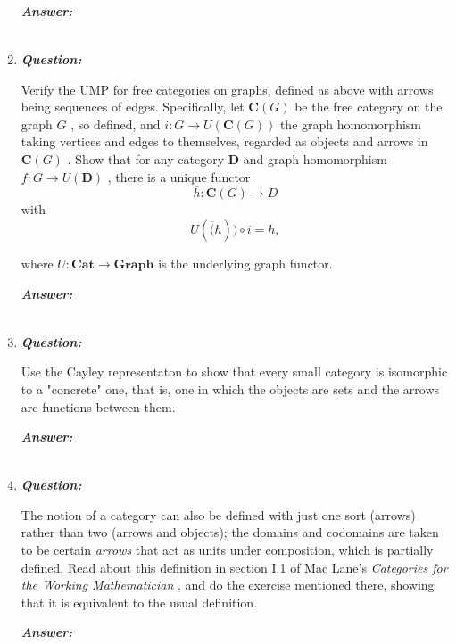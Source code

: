 \documentclass{article}
\begin{document}
\begin{enumerate}
	      \textbf{\textit{Answer:}}

	      \begin{align*}
	      \end{align*}



	\item
	      \textbf{\textit{Question:}}

	      Verify the UMP for free categories on graphs, defined as above with arrows being sequences of edges. Specifically, let $ \textbf{C} (G) $ be the free category on the graph $ G $ , so defined, and $ i : G \rightarrow U(\textbf{C}(G) ) $ the graph homomorphism taking vertices and edges to themselves, regarded as objects and arrows in $ \textbf{C} (G) $ . Show that for any category \textbf{D} and graph homomorphism $ f : G \rightarrow U(\textbf{D} ) $ , there is a unique functor
	      \[
		      \overline{h} : \textbf{C}(G) \rightarrow D
	      \]
	      with
	      \[ U(\overline(h)) \circ i = h ,\]

	      where $ U : \textbf{Cat} \rightarrow \textbf{Graph}  $ is the underlying graph functor.


	      \textbf{\textit{Answer:}}

	      \begin{align*}
	      \end{align*}



	\item
	      \textbf{\textit{Question:}}

	      Use the Cayley representaton to show that every small category is isomorphic to a "concrete" one, that is, one in which the objects are sets and the arrows are functions between them.

	      \textbf{\textit{Answer:}}

	      \begin{align*}
	      \end{align*}



	\item
	      \textbf{\textit{Question:}}

	      The notion of a category can also be defined with just one sort (arrows) rather than two (arrows and objects); the domains and codomains are taken to be certain \textit{arrows} that act as units under composition, which is partially defined. Read about this definition in section I.1 of Mac Lane's \textit{Categories for the Working Mathematician} , and do the exercise mentioned there, showing that it is equivalent to the usual definition.

	      \textbf{\textit{Answer:}}

	      \begin{align*}
	      \end{align*}


\end{enumerate}
\end{document}
